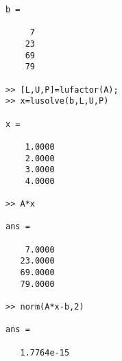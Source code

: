 \documentclass[12pt]{article}
\numberwithin{equation}{section}
\begin{document}
\begin{enumerate}
\begin{enumerate}
\begin{lstlisting}
b =

     7
    23
    69
    79

>> [L,U,P]=lufactor(A);
>> x=lusolve(b,L,U,P)

x =

    1.0000
    2.0000
    3.0000
    4.0000

>> A*x

ans =

    7.0000
   23.0000
   69.0000
   79.0000

>> norm(A*x-b,2)

ans =

   1.7764e-15
   \end{lstlisting}
   \end{enumerate}
\end{enumerate}
\end{document}
